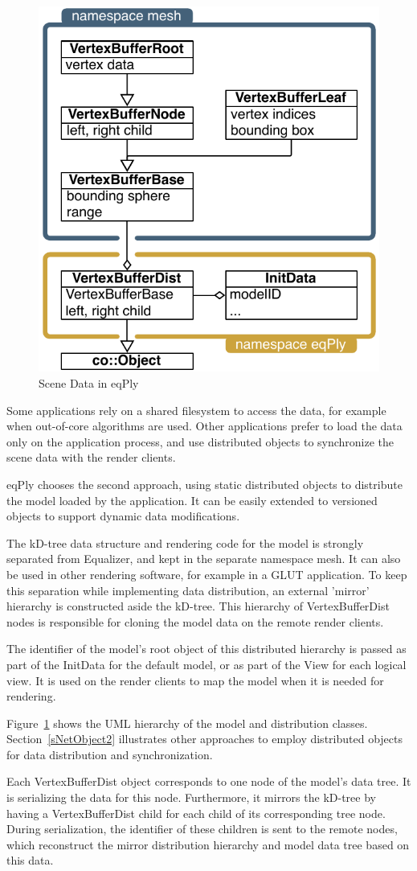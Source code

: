\documentclass[10pt,a4]{scrartcl}
\newcommand{\fig}[1]{Figure~\ref{#1}}
\newcommand{\sref}[1]{Section~\ref{#1}}
\begin{document}
\begin{figure}
  \includegraphics[width=.382\textwidth]{images/modelDist.pdf}
  {\caption{\label{fModelDist}Scene Data in eqPly}}
\end{figure}

Some applications rely on a shared filesystem to access the data, for example
when out-of-core algorithms are used. Other applications prefer to load the data
only on the application process, and use distributed objects to synchronize the
scene data with the render clients.

\textsf{eqPly} chooses the second approach, using static distributed objects to
distribute the model loaded by the application. It can be easily extended to
versioned objects to support dynamic data modifications.

The kD-tree data structure and rendering code for the model is strongly
separated from Equalizer, and kept in the separate namespace \textsf{mesh}. It
can also be used in other rendering software, for example in a GLUT
application. To keep this separation while implementing data distribution, an
external 'mirror' hierarchy is constructed aside the kD-tree. This hierarchy of
\textsf{VertexBufferDist} nodes is responsible for cloning the model data on the
remote render clients.

The identifier of the model's root object of this distributed hierarchy
is passed as part of the \textsf{InitData} for the default model, or as
part of the \textsf{View} for each logical view. It is used on the
render clients to map the model when it is needed for
rendering. 

\fig{fModelDist} shows the UML hierarchy of the model and distribution
classes. \sref{sNetObject2} illustrates other approaches to employ distributed
objects for data distribution and synchronization.

Each \textsf{VertexBufferDist} object corresponds to one node of the
model's data tree. It is serializing the data for this
node. Furthermore, it mirrors the kD-tree by having a
\textsf{VertexBufferDist} child for each child of its corresponding tree
node. During serialization, the identifier of these children is sent to
the remote nodes, which reconstruct the mirror distribution hierarchy
and model data tree based on this data.
\end{document}
